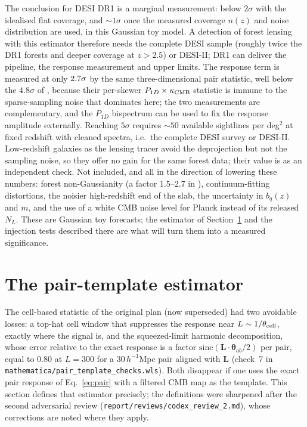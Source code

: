 \documentclass[11pt,a4paper]{article}
\newcommand{\vL}{\bm{L}}
\newcommand{\vth}{\bm{\theta}}
\newcommand{\kcmb}{\kappa_{\rm CMB}}
\begin{document}
The conclusion for DESI DR1 is a marginal measurement: below $2\sigma$ with the idealised flat coverage, and $\sim1\sigma$ once the measured coverage $n(z)$ and noise distribution are used, in this Gaussian toy model. A detection of forest lensing with this estimator therefore needs the complete DESI sample (roughly twice the DR1 forests and deeper coverage at $z>2.5$) or DESI-II; DR1 can deliver the pipeline, the response measurement and upper limits. The response term is measured at only $2.7\sigma$ by the same three-dimensional pair statistic, well below the $4.8\sigma$ of \citet{2405.14988}, because their per-skewer $P_{1D}\times\kcmb$ statistic is immune to the sparse-sampling noise that dominates here; the two measurements are complementary, and the $P_{1D}$ bispectrum can be used to fix the response amplitude externally. Reaching $5\sigma$ requires $\sim50$ available sightlines per deg$^2$ at fixed redshift with cleaned spectra, i.e.\ the complete DESI survey or DESI-II. Low-redshift galaxies as the lensing tracer avoid the deprojection but not the sampling noise, so they offer no gain for the same forest data; their value is as an independent check. Not included, and all in the direction of lowering these numbers: forest non-Gaussianity (a factor 1.5--2.7 in \citealt{2209.04564}), continuum-fitting distortions, the noisier high-redshift end of the slab, the uncertainty in $b_q(z)$ and $m$, and the use of a white CMB noise level for Planck instead of its released $N_L$. These are Gaussian toy forecasts; the estimator of Section~\ref{sec:pair} and the injection tests described there are what will turn them into a measured significance.

\section{The pair-template estimator}
\label{sec:pair}

The cell-based statistic of the original plan (now superseded) had two avoidable losses: a top-hat cell window that suppresses the response near $L\sim1/\theta_{\rm cell}$, exactly where the signal is, and the squeezed-limit harmonic decomposition, whose error relative to the exact response is a factor $\mathrm{sinc}(\vL\cdot\vth_{ab}/2)$ per pair, equal to $0.80$ at $L=300$ for a $30\,h^{-1}$Mpc pair aligned with $\vL$ (check~7 in \texttt{mathematica/pair\_template\_checks.wls}). Both disappear if one uses the exact pair response of Eq.~\eqref{eq:pair} with a filtered CMB map as the template. This section defines that estimator precisely; the definitions were sharpened after the second adversarial review (\texttt{report/reviews/codex\_review\_2.md}), whose corrections are noted where they apply.
\end{document}

